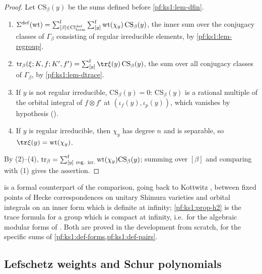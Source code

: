 \begin{proof}
Let $\mathrm{CS}_\beta(y)$ be the sums defined before \cref{pf:ks1:lem-dfin}.
\begin{enumerate}
\item $\Sigma^{\mathrm{def}}(\mathrm{wt})=\textstyle\sum\nolimits^{\mathrm f}_{[\beta]\in\mathrm{Cl}^{\mathrm{def}}_{\mathrm{form}}}\textstyle\sum\nolimits^{\mathrm f}_{[y]}\mathrm{wt}(\chi_y)\,\mathrm{CS}_\beta(y)$, the inner sum
  over the conjugacy classes of $\Gamma_\beta$ consisting of regular irreducible elements, by \cref{pf:ks1:lem-regroup}.
\item $\mathrm{tr}_\beta(\xi;K,f;K',f')=\ksonefs_{[y]}\tr\xi(y)\,\mathrm{CS}_\beta(y)$, the sum over all conjugacy classes of $\Gamma_\beta$, by
  \cref{pf:ks1:lem-dtrace}.
\item If $y$ is not regular irreducible, $\mathrm{CS}_\beta(y)=0$: $\mathrm{CS}_\beta(y)$ is a rational multiple of the orbital integral of
  $f\otimes f'$ at $(\iota_f(y),\iota_p(y))$, which vanishes by hypothesis
  ().
\item If $y$ is regular irreducible, then $\chi_y$ has degree $n$ and is separable, so $\tr\xi(y)=\mathrm{wt}(\chi_y)$.
\end{enumerate}
By (2)--(4), $\mathrm{tr}_\beta=\ksonefs_{[y]\ \mathrm{reg.\ irr.}}\mathrm{wt}(\chi_y)\mathrm{CS}_\beta(y)$; summing over $[\beta]$ and comparing
with (1) gives the assertion.
\end{proof}

\begin{remark}\label{pf:ks1:rem-counting}
 is a formal counterpart of the comparison, going back to Kottwitz \cite{Kottwitz1990,Kottwitz1992}, between
fixed points of Hecke correspondences on unitary Shimura varieties and orbital integrals on an inner form which is definite at
infinity; \cref{pf:ks1:prop-h2} is the trace formula for a group which is compact at infinity, i.e.\ for the algebraic modular forms of
\cite{Gross1999}. Both are proved in the development from scratch, for the specific sums of \cref{pf:ks1:def-forms,pf:ks1:def-pairs}.
\end{remark}


\subsection{Lefschetz weights and Schur polynomials}\label{pf:ks1:sec-schur}

